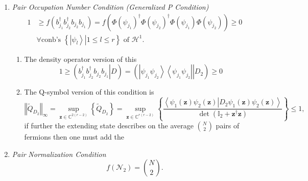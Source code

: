 \documentclass[aps,preprint]{revtex4}%
\begin{document}
\begin{enumerate}
\item \emph{Pair Occupation Number Condition (Generalized P Condition)}
\begin{align}
1  &  \geq f\left(  b_{j_{1}}^{\dagger}b_{j_{2}}^{\dagger}b_{j_{2}}b_{j_{1}%
}\right)  =f\left(  \Phi\left(  \psi_{j_{1}}\right)  ^{\dagger}\Phi\left(
\psi_{j_{2}}\right)  ^{\dagger}\Phi\left(  \psi_{j_{1}}\right)  \Phi\left(
\psi_{j_{2}}\right)  \right)  \geq0\nonumber\\
&  \forall\text{conb's }\left\{  \left.  \left\vert \psi_{l}\right\rangle
\right\vert 1\leq l\leq r\right\}  \text{ of }\mathcal{H}^{1}.
\label{PairOcc1}%
\end{align}


\begin{enumerate}
\item The density operator version of this
\begin{equation}
1\geq\left(  \left.  b_{j_{1}}^{\dagger}b_{j_{2}}^{\dagger}b_{j_{2}}b_{j_{1}%
}\right\vert D\right)  =\left(  \left.  \left\vert \psi_{j_{1}}\psi_{j_{2}%
}\right\rangle \left\langle \psi_{j_{1}}\psi_{j_{2}}\right\vert \right\vert
D_{2}\right)  \geq0
\end{equation}


\item The Q-symbol version of this condition is
\begin{equation}
\left\Vert \tilde{Q}_{D_{2}}\right\Vert _{\infty}=\sup_{\mathbf{z\in
}\mathbb{C}^{2\left(  r-2\right)  }}\left\{  \tilde{Q}_{D_{2}}\right\}
=\sup_{\mathbf{z\in}\mathbb{C}^{r\left(  r-2\right)  }}\left\{  \frac
{\left\langle \psi_{1}\left(  \mathbf{z}\right)  \psi_{2}\left(
\mathbf{z}\right)  \left\vert D_{2}\psi_{1}\left(  \mathbf{z}\right)  \psi
_{2}\left(  \mathbf{z}\right)  \right.  \right\rangle }{\det\left(
\mathbb{I}_{2}+\mathbf{z}^{\dagger}\mathbf{z}\right)  }\right\}
\leq1,\nonumber
\end{equation}
if further the extending state describes on the average $\binom{N}{2}$ pairs
of fermions then one must add the
\end{enumerate}

\item \emph{Pair} \emph{Normalization Condition}%
\begin{equation}
f\left(  \mathcal{N}_{2}\right)  =\binom{N}{2}.
\end{equation}



\end{enumerate}
\end{document}
